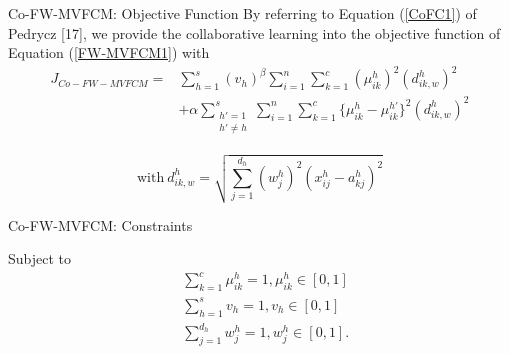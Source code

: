 \documentclass[compress,sky blue]{beamer}
\begin{document}
\begin{frame}{Co-FW-MVFCM: Objective Function}
	\vspace{-0.6cm}	
\scriptsize By referring to Equation (\ref{CoFC1}) of Pedrycz [17], we provide the collaborative learning into the objective function of Equation (\ref{FW-MVFCM1}) with 
    \begin{equation}
\begin{aligned}
J_{Co-FW-MVFCM}  ={} & \sum_{h=1}^{s} (v_{h})^{\beta}\sum_{i=1}^{n}\sum_{k=1}^{c} \left(\mu_{ik}^{h} \right)^{2}\left(d_{ik,w}^{h} \right)^2   \\
      & +\alpha \sum_{\substack{h'= 1\\ h'\ne h}}^{s}\sum_{i=1}^{n}\sum_{k=1}^{c}\{ \mu_{ik}^{h}-\mu_{ik}^{h'} \}^{2}\left(d_{ik,w}^{h} \right)^2
\end{aligned}
\label{Co-FW-MVFCM} 
\end{equation}
\item 
    \begin{equation}
\text{with} \ d_{ik,w}^{h}=\sqrt{\sum_{j=1}^{d_{h}}\left(w_{j}^{h}\right)^{2}\left(x_{ij}^{h}-a_{kj}^{h}\right)^{2}}
\label{d_ikw}
\end{equation}


\end{frame}

\begin{frame}{Co-FW-MVFCM: Constraints}
	\vspace{-0.3cm}	
    \begin{itemize}
    Subject to
\begin{equation}
\begin{aligned}
{} & \sum_{k=1}^{c}\mu_{ik}^{h}=1, \mu_{ik}^{h}\in[0,1] \\
      & \sum_{h=1}^{s}v_{h}=1, v_{h}\in[0,1]\\
      & \sum_{j=1}^{d_h} w_j^{h}= 1, w_j^{h}\in[0,1].
\end{aligned}
\label{constraint1}
\end{equation}
    
	\end{itemize}

\end{frame}
\end{document}
